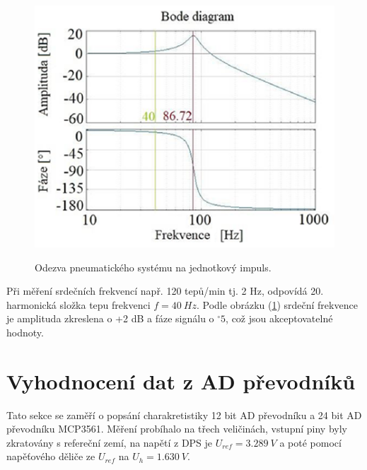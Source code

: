 \begin{figure}[H]
    \caption{Odezva pneumatického systému na jednotkový impuls.}
    \includegraphics[width=1\textwidth]{pictures/freq_char_pneu.png}
    \label{fig:pneu_freq_char}
\end{figure}
Při měření srdečních frekvencí např. 120 tepů/min tj. 2 Hz, odpovídá 20. harmonická složka tepu frekvenci $f = 40 \ Hz$. Podle obrázku (\ref{fig:pneu_freq_char}) srdeční frekvence je amplituda zkreslena o +2 dB a fáze signálu o $^\circ 5$, což jsou akceptovatelné hodnoty.

\section{Vyhodnocení dat z AD převodníků}
Tato sekce se zaměří o popsání charakretistiky 12 bit AD převodníku a 24 bit AD převodníku MCP3561. Měření probíhalo na třech veličinách, vstupní piny byly zkratovány s refereční zemí, na napětí z DPS je $U_{ref} = 3.289 \ V$ a poté pomocí napěťového děliče ze $U_{ref}$ na $U_{h} = 1.630 \ V$.
